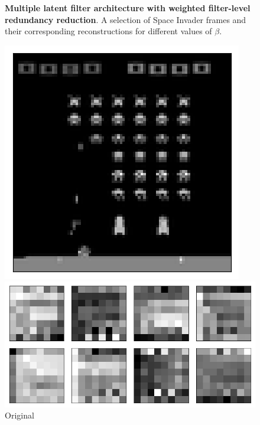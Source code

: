 \begin{figure}[h!]
\begin{multicols}{4}
    \caption{$\beta = 32$}
\end{multicols}
\caption{\textbf{Multiple latent filter architecture with weighted filter-level redundancy reduction}. A selection of Space Invader frames and their corresponding reconstructions for different values of $\beta$.}
\label{fig:weighted_average_originals_and_reconstructions}
\end{figure}




\begin{figure}[h!]
\centering
\captionsetup{justification=centering}
\begin{minipage}{0.4\textwidth}
\centering
\captionsetup{justification=centering}
\includegraphics[scale=0.4]{figures/results/weighted_average/beta_1_sample_3_original.png}
\caption{Original}
\end{minipage}
\begin{minipage}{0.55\textwidth}
\centering
\captionsetup{justification=centering}
\includegraphics[scale=0.42]{figures/results/weighted_average/beta_1_convolutional_layers_sample_3.png}

\end{minipage}
\end{figure}
